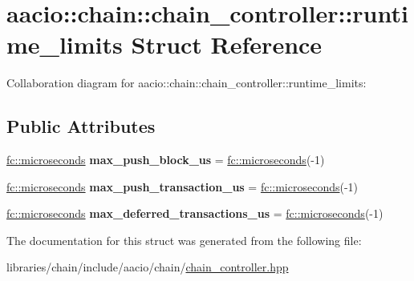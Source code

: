 \hypertarget{structaacio_1_1chain_1_1chain__controller_1_1runtime__limits}{}\section{aacio\+:\+:chain\+:\+:chain\+\_\+controller\+:\+:runtime\+\_\+limits Struct Reference}
\label{structaacio_1_1chain_1_1chain__controller_1_1runtime__limits}


Collaboration diagram for aacio\+:\+:chain\+:\+:chain\+\_\+controller\+:\+:runtime\+\_\+limits\+:
\subsection*{Public Attributes}
\begin{DoxyCompactItemize}
\item 
\mbox{\label{structaacio_1_1chain_1_1chain__controller_1_1runtime__limits_af4443ea3a38de15ff01040fb677fb531}} 
\mbox{\hyperlink{classfc_1_1microseconds}{fc\+::microseconds}} {\bfseries max\+\_\+push\+\_\+block\+\_\+us} = \mbox{\hyperlink{classfc_1_1microseconds}{fc\+::microseconds}}(-\/1)
\item 
\mbox{\label{structaacio_1_1chain_1_1chain__controller_1_1runtime__limits_a47582bf6104f20679a536caef17d3676}} 
\mbox{\hyperlink{classfc_1_1microseconds}{fc\+::microseconds}} {\bfseries max\+\_\+push\+\_\+transaction\+\_\+us} = \mbox{\hyperlink{classfc_1_1microseconds}{fc\+::microseconds}}(-\/1)
\item 
\mbox{\label{structaacio_1_1chain_1_1chain__controller_1_1runtime__limits_aaf9f264663681383fe23819e9665ad10}} 
\mbox{\hyperlink{classfc_1_1microseconds}{fc\+::microseconds}} {\bfseries max\+\_\+deferred\+\_\+transactions\+\_\+us} = \mbox{\hyperlink{classfc_1_1microseconds}{fc\+::microseconds}}(-\/1)
\end{DoxyCompactItemize}


The documentation for this struct was generated from the following file\+:\begin{DoxyCompactItemize}
\item 
libraries/chain/include/aacio/chain/\mbox{\hyperlink{chain__controller_8hpp}{chain\+\_\+controller.\+hpp}}\end{DoxyCompactItemize}
